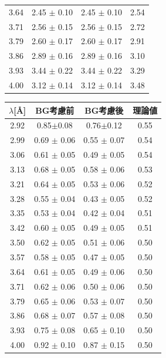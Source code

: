 \begin{table}[H]
\begin{minipage}{0.5\hsize}
\begin{tabular}{cccc}
3.64 	&	2.45 	$\pm$	0.10 	&	2.45 	$\pm$	0.10 	&	2.54 	\\
3.71 	&	2.56 	$\pm$	0.15 	&	2.56 	$\pm$	0.15 	&	2.72 	\\
3.79 	&	2.60 	$\pm$	0.17 	&	2.60 	$\pm$	0.17 	&	2.91 	\\
3.86 	&	2.89 	$\pm$	0.16 	&	2.89 	$\pm$	0.16 	&	3.10 	\\
3.93 	&	3.44 	$\pm$	0.22 	&	3.44 	$\pm$	0.22 	&	3.29 	\\
4.00 	&	3.12 	$\pm$	0.14 	&	3.12 	$\pm$	0.14 	&	3.48 	\\ \hline
\end{tabular}
\end{minipage}
\begin{minipage}{0.5\hsize}
\centering
\begin{tabular}{cccc}
$\lambda$[\AA]&BG考慮前&BG考慮後&理論値\\ \hline
2.92&0.85$\pm$0.08&0.76$\pm$0.12&0.55\\
2.99 	&	0.69 	$\pm$	0.06 	&	0.55 	$\pm$	0.07 	&	0.54 	\\
3.06 	&	0.61 	$\pm$	0.05 	&	0.49 	$\pm$	0.05 	&	0.54 	\\
3.13 	&	0.68 	$\pm$	0.05 	&	0.58 	$\pm$	0.06 	&	0.53 	\\
3.21 	&	0.64 	$\pm$	0.05 	&	0.53 	$\pm$	0.06 	&	0.52 	\\
3.28 	&	0.55 	$\pm$	0.04 	&	0.43 	$\pm$	0.05 	&	0.52 	\\
3.35 	&	0.53 	$\pm$	0.04 	&	0.42 	$\pm$	0.04 	&	0.51 	\\
3.42 	&	0.60 	$\pm$	0.05 	&	0.49 	$\pm$	0.05 	&	0.51 	\\
3.50 	&	0.62 	$\pm$	0.05 	&	0.51 	$\pm$	0.06 	&	0.50 	\\
3.57 	&	0.58 	$\pm$	0.05 	&	0.47 	$\pm$	0.05 	&	0.50 	\\
3.64 	&	0.61 	$\pm$	0.05 	&	0.49 	$\pm$	0.06 	&	0.50 	\\
3.71 	&	0.62 	$\pm$	0.06 	&	0.50 	$\pm$	0.06 	&	0.50 	\\
3.79 	&	0.65 	$\pm$	0.06 	&	0.53 	$\pm$	0.07 	&	0.50 	\\
3.86 	&	0.68 	$\pm$	0.07 	&	0.57 	$\pm$	0.08 	&	0.50 	\\
3.93 	&	0.75 	$\pm$	0.08 	&	0.65 	$\pm$	0.10 	&	0.50 	\\
4.00 	&	0.92 	$\pm$	0.10 	&	0.87 	$\pm$	0.15 	&	0.50 	\\ \hline
\end{tabular}
\end{minipage}
\end{table}

